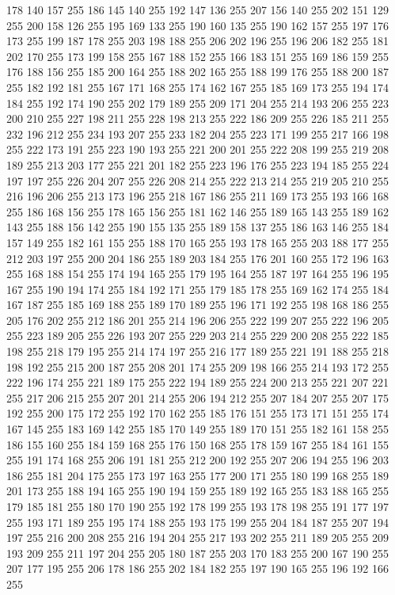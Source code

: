 178 140 157 255 186 145 140 255 192 147 136 255 207 156 140 255 202 151 129 255 200 158 126 255 195 169 133 255 190 160 135 255 190 162 157 255 197 176 173 255 199 187 178 255 203 198 188 255 206 202 196 255 196 206 182 255 181 202 170 255 173 199 158 255
167 188 152 255 166 183 151 255 169 186 159 255 176 188 156 255 185 200 164 255 188 202 165 255 188 199 176 255 188 200 187 255 182 192 181 255 167 171 168 255 174 162 167 255 185 169 173 255 194 174 184 255 192 174 190 255 202 179 189 255 209 171 204 255
214 193 206 255 223 200 210 255 227 198 211 255 228 198 213 255 222 186 209 255 226 185 211 255 232 196 212 255 234 193 207 255 233 182 204 255 223 171 199 255 217 166 198 255 222 173 191 255 223 190 193 255 221 200 201 255 222 208 199 255 219 208 189 255
213 203 177 255 221 201 182 255 223 196 176 255 223 194 185 255 224 197 197 255 226 204 207 255 226 208 214 255 222 213 214 255 219 205 210 255 216 196 206 255 213 173 196 255 218 167 186 255 211 169 173 255 193 166 168 255 186 168 156 255 178 165 156 255
181 162 146 255 189 165 143 255 189 162 143 255 188 156 142 255 190 155 135 255 189 158 137 255 186 163 146 255 184 157 149 255 182 161 155 255 188 170 165 255 193 178 165 255 203 188 177 255 212 203 197 255 200 204 186 255 189 203 184 255 176 201 160 255
172 196 163 255 168 188 154 255 174 194 165 255 179 195 164 255 187 197 164 255 196 195 167 255 190 194 174 255 184 192 171 255 179 185 178 255 169 162 174 255 184 167 187 255 185 169 188 255 189 170 189 255 196 171 192 255 198 168 186 255 205 176 202 255
212 186 201 255 214 196 206 255 222 199 207 255 222 196 205 255 223 189 205 255 226 193 207 255 229 203 214 255 229 200 208 255 222 185 198 255 218 179 195 255 214 174 197 255 216 177 189 255 221 191 188 255 218 198 192 255 215 200 187 255 208 201 174 255
209 198 166 255 214 193 172 255 222 196 174 255 221 189 175 255 222 194 189 255 224 200 213 255 221 207 221 255 217 206 215 255 207 201 214 255 206 194 212 255 207 184 207 255 207 175 192 255 200 175 172 255 192 170 162 255 185 176 151 255 173 171 151 255
174 167 145 255 183 169 142 255 185 170 149 255 189 170 151 255 182 161 158 255 186 155 160 255 184 159 168 255 176 150 168 255 178 159 167 255 184 161 155 255 191 174 168 255 206 191 181 255 212 200 192 255 207 206 194 255 196 203 186 255 181 204 175 255
173 197 163 255 177 200 171 255 180 199 168 255 189 201 173 255 188 194 165 255 190 194 159 255 189 192 165 255 183 188 165 255 179 185 181 255 180 170 190 255 192 178 199 255 193 178 198 255 191 177 197 255 193 171 189 255 195 174 188 255 193 175 199 255
204 184 187 255 207 194 197 255 216 200 208 255 216 194 204 255 217 193 202 255 211 189 205 255 209 193 209 255 211 197 204 255 205 180 187 255 203 170 183 255 200 167 190 255 207 177 195 255 206 178 186 255 202 184 182 255 197 190 165 255 196 192 166 255
